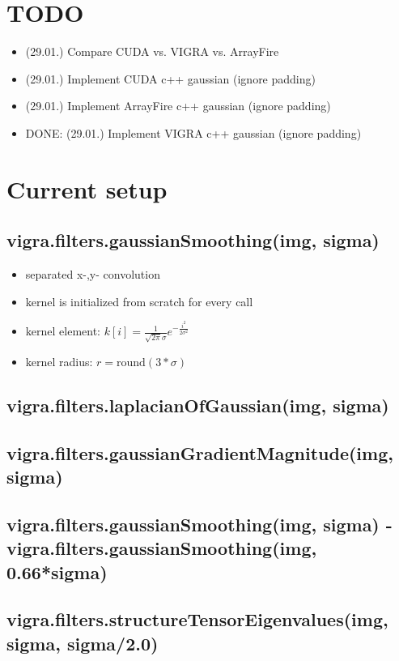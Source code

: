 \documentclass[12pt,a4paper]{article}
\begin{document}
\setlength{\parindent}{0pt}


\section{TODO}
  \begin{itemize}
    \item (29.01.) Compare CUDA vs. VIGRA vs. ArrayFire
    \item (29.01.) Implement CUDA c++ gaussian (ignore padding)
    \item (29.01.) Implement ArrayFire c++ gaussian (ignore padding)
    \item DONE: (29.01.) Implement VIGRA c++ gaussian (ignore padding)
  \end{itemize}


\section{Current setup}
  \subsection{vigra.filters.gaussianSmoothing(img, sigma)}
    \begin{itemize}
      \item separated x-,y- convolution
      \item kernel is initialized from scratch for every call
      \item kernel element: $k[i] = \frac{1}{\sqrt{2\pi}\sigma} e^{-\frac{i^2}{2\sigma^2}} $
      \item kernel radius: $r = \textrm{round}(3*\sigma)$
    \end{itemize}
  \subsection{vigra.filters.laplacianOfGaussian(img, sigma)}
  \subsection{vigra.filters.gaussianGradientMagnitude(img, sigma)}
  \subsection{vigra.filters.gaussianSmoothing(img, sigma) - vigra.filters.gaussianSmoothing(img, 0.66*sigma)}
  \subsection{vigra.filters.structureTensorEigenvalues(img, sigma, sigma/2.0)}
\end{document}
